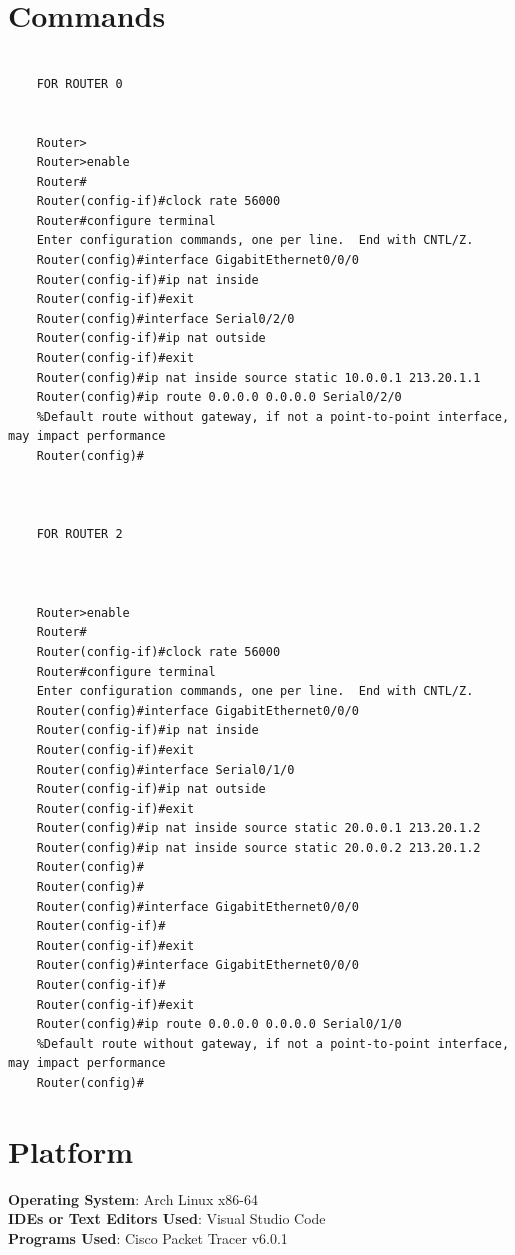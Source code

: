 \documentclass[11pt]{article}
\begin{document}
\section{Commands}

\begin{verbatim}

	FOR ROUTER 0


	Router>
	Router>enable
	Router#
	Router(config-if)#clock rate 56000
	Router#configure terminal
	Enter configuration commands, one per line.  End with CNTL/Z.
	Router(config)#interface GigabitEthernet0/0/0
	Router(config-if)#ip nat inside
	Router(config-if)#exit
	Router(config)#interface Serial0/2/0
	Router(config-if)#ip nat outside
	Router(config-if)#exit
	Router(config)#ip nat inside source static 10.0.0.1 213.20.1.1
	Router(config)#ip route 0.0.0.0 0.0.0.0 Serial0/2/0
	%Default route without gateway, if not a point-to-point interface, may impact performance
	Router(config)#
	
	
	
	FOR ROUTER 2
	
	
	
	Router>enable
	Router#
	Router(config-if)#clock rate 56000
	Router#configure terminal
	Enter configuration commands, one per line.  End with CNTL/Z.
	Router(config)#interface GigabitEthernet0/0/0
	Router(config-if)#ip nat inside
	Router(config-if)#exit
	Router(config)#interface Serial0/1/0
	Router(config-if)#ip nat outside
	Router(config-if)#exit
	Router(config)#ip nat inside source static 20.0.0.1 213.20.1.2
	Router(config)#ip nat inside source static 20.0.0.2 213.20.1.2
	Router(config)#
	Router(config)#
	Router(config)#interface GigabitEthernet0/0/0
	Router(config-if)#
	Router(config-if)#exit
	Router(config)#interface GigabitEthernet0/0/0
	Router(config-if)#
	Router(config-if)#exit
	Router(config)#ip route 0.0.0.0 0.0.0.0 Serial0/1/0
	%Default route without gateway, if not a point-to-point interface, may impact performance
	Router(config)#
\end{verbatim}

\section{Platform}
	\textbf{Operating System}: Arch Linux x86-64\\
	\textbf{IDEs or Text Editors Used}: Visual Studio Code\\
	\textbf{Programs Used}: Cisco Packet Tracer v6.0.1
\end{document}

